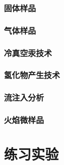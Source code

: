 \subsubsection{固体样品}
\subsubsection{气体样品}
\subsubsection{冷真空汞技术}
\subsubsection{氢化物产生技术}
\subsubsection{流注入分析}
\subsubsection{火焰微样品}
\newpage
\section{练习实验}
\newpage
\begin{problemset}
\item 
\item 
\item 
\item 
\item 
\item 
\end{problemset}
